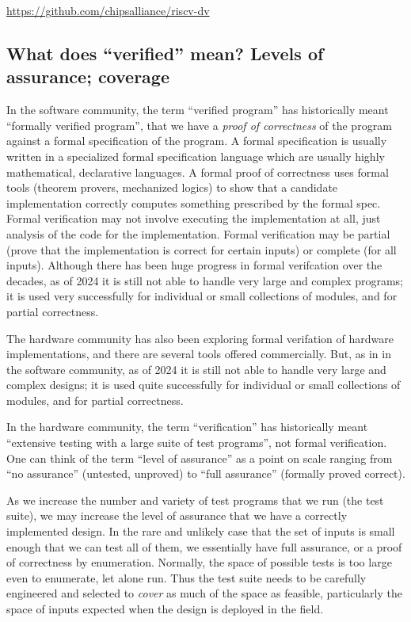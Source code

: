 \begin{tabbing}
\hmm \= \url{https://github.com/chipsalliance/riscv-dv}
\end{tabbing}


\subsection{What does ``verified'' mean? Levels of assurance; coverage}


In the software community, the term ``verified program'' has
historically meant ``formally verified program'', {\ie} that we have a
\emph{proof of correctness} of the program against a formal
specification of the program.  A formal specification is usually
written in a specialized formal specification language which are
usually highly mathematical, declarative languages.  A formal proof of
correctness uses formal tools (theorem provers, mechanized logics) to
show that a candidate implementation correctly computes something
prescribed by the formal spec.  Formal verification may not involve
executing the implementation at all, just analysis of the code for the
implementation.  Formal verification may be partial (prove that the
implementation is correct for certain inputs) or complete (for all
inputs).  Although there has been huge progress in formal verifcation
over the decades, as of 2024 it is still not able to handle very large
and complex programs; it is used very successfully for individual or
small collections of modules, and for partial correctness.

The hardware community has also been exploring formal verifation of
hardware implementations, and there are several tools offered
commercially.  But, as in in the software community, as of 2024 it is
still not able to handle very large and complex designs; it is used
quite successfully for individual or small collections of modules, and
for partial correctness.

In the hardware community, the term ``verification'' has historically
meant ``extensive testing with a large suite of test programs'', not
formal verification.  One can think of the term ``level of assurance''
as a point on scale ranging from ``no assurance'' (untested, unproved)
to ``full assurance'' (formally proved correct).

As we increase the number and variety of test programs that we run
(the test suite), we may increase the level of assurance that we have
a correctly implemented design.  In the rare and unlikely case that
the set of inputs is small enough that we can test all of them, we
essentially have full assurance, or a proof of correctness by
enumeration.  Normally, the space of possible tests is too large even
to enumerate, let alone run.  Thus the test suite needs to be
carefully engineered and selected to \emph{cover} as much of the space
as feasible, particularly the space of inputs expected when the design
is deployed in the field.

